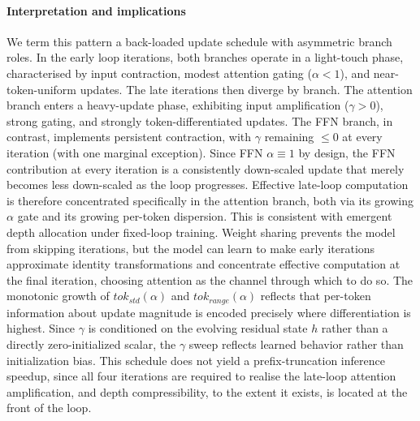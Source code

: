 \paragraph{Interpretation and implications}
We term this pattern a back-loaded update schedule with asymmetric branch roles. In the early loop iterations, both branches operate in a light-touch phase, characterised by input contraction, modest attention gating ($\alpha<1$), and near-token-uniform updates. The late iterations then diverge by branch. The attention branch enters a heavy-update phase, exhibiting input amplification ($\gamma>0$), strong gating, and strongly token-differentiated updates. The FFN branch, in contrast, implements persistent contraction, with $\gamma$ remaining $\leq 0$ at every iteration (with one marginal exception). Since FFN $\alpha\!\equiv\!1$ by design, the FFN contribution at every iteration is a consistently down-scaled update that merely becomes less down-scaled as the loop progresses. Effective late-loop computation is therefore concentrated specifically in the attention branch, both via its growing $\alpha$ gate and its growing per-token dispersion. This is consistent with emergent depth allocation under fixed-loop training. Weight sharing prevents the model from skipping iterations, but the model can learn to make early iterations approximate identity transformations and concentrate effective computation at the final iteration, choosing attention as the channel through which to do so. The monotonic growth of $tok_{std}(\alpha)$ and $tok_{range}(\alpha)$ reflects that per-token information about update magnitude is encoded precisely where differentiation is highest. Since $\gamma$ is conditioned on the evolving residual state $h$ rather than a directly zero-initialized scalar, the $\gamma$ sweep reflects learned behavior rather than initialization bias. This schedule does not yield a prefix-truncation inference speedup, since all four iterations are required to realise the late-loop attention amplification, and depth compressibility, to the extent it exists, is located at the front of the loop.


